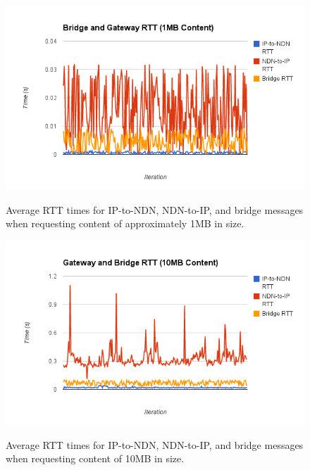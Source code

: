 \begin{figure}
\begin{center}
\includegraphics[scale=0.4]{./images/small.png}
\label{fig:perf1}
\caption{Average RTT times for IP-to-NDN, NDN-to-IP, and bridge messages when requesting content of approximately 1MB in size.}
\end{center}
\end{figure}

\begin{figure}
\begin{center}
\includegraphics[scale=0.4]{./images/large.png}
\label{fig:perf2}
\caption{Average RTT times for IP-to-NDN, NDN-to-IP, and bridge messages when requesting content of 10MB in size.}
\end{center}
\end{figure}


